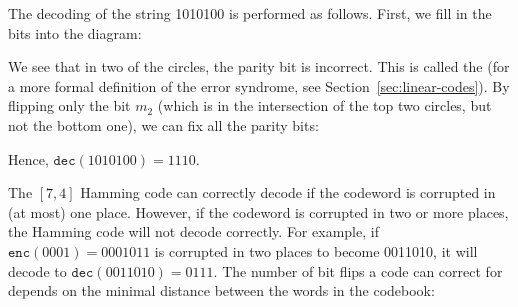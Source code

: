 \begin{example}
The decoding of the string 1010100 is performed as follows. First, we fill in the bits into the diagram:
\begin{center}
\end{center}
We see that in two of the circles, the parity bit is incorrect. This is called the  (for a more formal definition of the error syndrome, see Section~\ref{sec:linear-codes}). By flipping only the bit $m_2$ (which is in the intersection of the top two circles, but not the bottom one), we can fix all the parity bits:
\begin{center}
\end{center}
Hence, $\mathtt{dec}(1010100) = 1110$.
\end{example}
The $[7,4]$ Hamming code can correctly decode if the codeword is corrupted in (at most) one place. However, if the codeword is corrupted in two or more places, the Hamming code will not decode correctly. For example, if $\mathtt{enc}(0001) = 0001011$ is corrupted in two places to become 0011010, it will decode to $\mathtt{dec}(0011010) = 0111$. The number of bit flips a code can correct for depends on the minimal distance between the words in the codebook:

